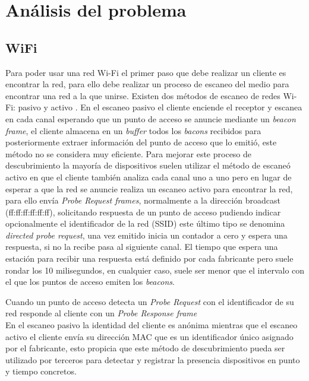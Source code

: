 \documentclass[../proyecto.tex]{subfiles}
\begin{document}
\chapter{Análisis del problema}
\section{WiFi}

Para poder usar una red Wi-Fi el primer paso que debe realizar un cliente es encontrar la red, para ello debe realizar un proceso de escaneo del medio para encontrar una red a la que unirse. Existen dos métodos de escaneo de redes Wi-Fi: pasivo y activo \cite{ieee80211_2016}. En el escaneo pasivo el cliente enciende el receptor y escanea en cada canal esperando que un punto de acceso se anuncie mediante un \textit{beacon frame}, el cliente almacena en un \textit{buffer} todos los \textit{bacons} recibidos para posteriormente extraer información del punto de acceso que lo emitió, este método no se considera muy eficiente. Para mejorar este proceso de descubrimiento la mayoría de dispositivos suelen utilizar el método de escaneó activo en que el cliente también analiza cada canal uno a uno pero en lugar de esperar a que la red se anuncie realiza un escaneo activo para encontrar la red, para ello envía \textit{Probe Request frames}, normalmente a la dirección broadcast (ff:ff:ff:ff:ff:ff), solicitando respuesta de un punto de acceso pudiendo indicar opcionalmente el identificador de la red (SSID) este último tipo se denomina \textit{directed probe request}, una vez emitido inicia un contador a cero y espera una respuesta, si no la recibe pasa al siguiente canal. El tiempo que espera una estación para recibir una respuesta está definido por cada fabricante pero suele rondar los 10 milisegundos, en cualquier caso, suele ser menor que el intervalo con el que los puntos de acceso emiten los \textit{beacons}.

Cuando un punto de acceso detecta un \textit{Probe Request} con el identificador de su red responde al cliente con un \textit{Probe Response frame}\\

En el escaneo pasivo la identidad del cliente es anónima mientras que el escaneo activo el cliente envía su dirección MAC que es un identificador único asignado por el fabricante, esto propicia que este método de descubrimiento pueda ser utilizado por terceros para detectar y registrar la presencia dispositivos en punto y tiempo concretos.\\
\end{document}
